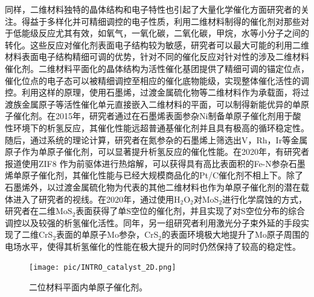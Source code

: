     同样，二维材料独特的晶体结构和电子特性也引起了大量化学催化方面研究者的关注。得益于多样化并可精细调控的电子性质，利用二维材料制得的催化剂对那些对于低能级反应尤其有效，如氧气，一氧化碳，二氧化碳，甲烷，水等小分子之间的转化。这些反应对催化剂表面电子结构较为敏感，研究者可以最大可能的利用二维材料表面电子结构精细可调的优势，针对不同的催化反应对针对性的涉及二维材料催化剂。二维材料平面化的晶体结构为活性催化基团提供了精细可调的锚定位点，催化位点的电子态可以被精细调控至相应的催化底物能级，实现整体催化活性的调控。利用这样的原理，使用石墨烯，过渡金属硫化物等二维材料作为承载面，将过渡族金属原子等活性催化单元直接嵌入二维材料的平面，可以制得新能优异的单原子催化剂。在2015年，研究者通过在石墨烯表面参杂Ni制备单原子催化剂用于酸性环境下的析氢反应，其催化性能远超普通基催化剂并且具有极高的循环稳定性。随后，通过系统的理论计算，研究者在氮参杂的石墨烯上筛选出V，Rh，Ir等金属原子作为单原子催化剂，可以显著提升析氢反应的催化性能。在2020年，有研究者报道使用ZIF8%
    作为前驱体进行热熔解，可以获得具有高比表面积的Fe-N参杂石墨烯单原子催化剂，其催化性能与已经大规模商品化的Pt/C催化剂不相上下。除了石墨烯外，以过渡金属硫化物为代表的其他二维材料也作为单原子催化剂的潜在载体进入了研究者的视线。在2020年，通过使用H$_2$O$_2$对MoS$_2$进行化学腐蚀的方式，研究者在二维MoS$_2$表面获得了单S空位的催化剂，并且实现了对S空位分布的综合调控以及较强的析氢催化活性。同年，另一组研究者利用激光分子束外延的手段实现了二维CrS$_2$表面的单原子Mo参杂，CrS$_2$的表面环境极大地提升了Mo原子周围的电场水平，使得其析氢催化的性能在极大提升的同时仍然保持了较高的稳定性。

    \begin{figure}
        \texttt{[image: pic/INTRO\_catalyst\_2D.png]}
        \caption{二位材料平面内单原子催化剂。}
        \label{}
    \end{figure}

